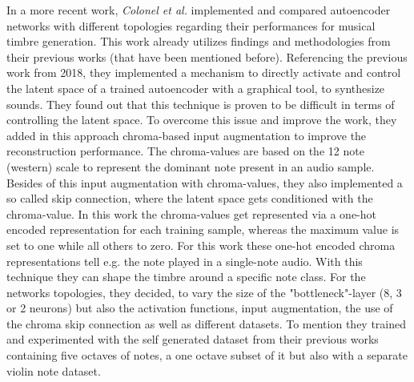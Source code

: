 In a more recent work, \textit{Colonel et al.} implemented and compared autoencoder networks with different topologies regarding their performances for musical timbre generation. \cite{Colonel2020} This work already utilizes findings and methodologies from their previous works (that have been mentioned before). Referencing the previous work from 2018, they implemented a mechanism to directly activate and control the latent space of a trained autoencoder with a graphical tool, to synthesize sounds. They found out that this technique is proven to be difficult in terms of controlling the latent space. To overcome this issue and improve the work, they added in this approach chroma-based input augmentation to improve the reconstruction performance. The chroma-values are based on the 12 note (western) scale to represent the dominant note present in an audio sample. Besides of this input augmentation with chroma-values, they also implemented a so called skip connection, where the latent space gets conditioned with the chroma-value. In this work the chroma-values get represented via a one-hot encoded representation for each training sample, whereas the maximum value is set to one while all others to zero. For this work these one-hot encoded chroma representations tell e.g. the note played in a single-note audio. With this technique they can shape the timbre around a specific note class. For the networks topologies, they decided, to vary the size of the "bottleneck"-layer (8, 3 or 2 neurons) but also the activation functions, input augmentation, the use of the chroma skip connection as well as different datasets. To mention they trained and experimented with the self generated dataset from their previous works containing five octaves of notes, a one octave subset of it but also with a separate violin note dataset.\\

